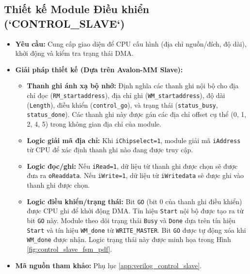 \subsection{Thiết kế Module Điều khiển (`CONTROL\_SLAVE`)}
\begin{itemize}
    \item \textbf{Yêu cầu:} Cung cấp giao diện để CPU cấu hình (địa chỉ nguồn/đích, độ dài), khởi động và kiểm tra trạng thái DMA.
    \item \textbf{Giải pháp thiết kế (Dựa trên Avalon-MM Slave):}
        \begin{itemize}
            \item \textbf{Thanh ghi ánh xạ bộ nhớ:} Định nghĩa các thanh ghi nội bộ cho địa chỉ đọc (\texttt{RM\_startaddress}), địa chỉ ghi (\texttt{WM\_startaddress}), độ dài (\texttt{Length}), điều khiển (\texttt{control\_go}), và trạng thái (\texttt{status\_busy}, \texttt{status\_done}). Các thanh ghi này được gán các địa chỉ offset cụ thể (0, 1, 2, 4, 5) trong không gian địa chỉ của module.
            \item \textbf{Logic giải mã địa chỉ:} Khi \texttt{iChipselect=1}, module giải mã \texttt{iAddress} từ CPU để xác định thanh ghi nào đang được truy cập.
            \item \textbf{Logic đọc/ghi:} Nếu \texttt{iRead=1}, dữ liệu từ thanh ghi được chọn sẽ được đưa ra \texttt{oReaddata}. Nếu \texttt{iWrite=1}, dữ liệu từ \texttt{iWritedata} sẽ được ghi vào thanh ghi được chọn.
            \item \textbf{Logic điều khiển/trạng thái:} Bit \texttt{GO} (bit 0 của thanh ghi điều khiển) được CPU ghi để khởi động DMA. Tín hiệu \texttt{Start} nội bộ được tạo ra từ bit \texttt{GO} này. Module theo dõi trạng thái \texttt{Busy} và \texttt{Done} dựa trên tín hiệu \texttt{Start} và tín hiệu \texttt{WM\_done} từ \texttt{WRITE\_MASTER}. Bit \texttt{GO} được tự động xóa khi \texttt{WM\_done} được nhận. Logic trạng thái này được minh họa trong Hình \ref{fig:control_slave_fsm_pdf}.
        \end{itemize}
    \item \textbf{Mã nguồn tham khảo:} Phụ lục \ref{app:verilog_control_slave}.
\end{itemize}


